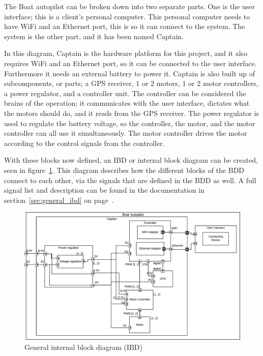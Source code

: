 The Boat autopilot can be broken down into two separate parts. One is the user interface; this is a client's personal computer. This personal computer needs to have WiFi and an Ethernet port, this is so it can connect to the system. The system is the other part, and it has been named Captain. 

In this diagram, Captain is the hardware platform for this project, and it also requires WiFi and an Ethernet port, so it can be connected to the user interface. Furthermore it needs an external battery to power it.  Captain is also built up of subcomponents, or parts; a GPS receiver, 1 or 2 motors, 1 or 2 motor controllers, a power regulator, and a controller unit. The controller can be considered the brains of the operation; it communicates with the user interface, dictates what the motors should do, and it reads from the GPS receiver. The power regulator is used to regulate the battery voltage, so the controller, the motor, and the motor controller can all use it simultaneously. The motor controller drives the motor according to the control signals from the controller. 

With these blocks now defined, an IBD or internal block diagram can be created, seen in figure~\ref{fig:generalibd}. This diagram describes how the different blocks of the BDD connect to each other, via the signals that are defined in the BDD as well. A full signal list and description can be found in the documentation in section~\ref{sec:general_ibd} on page~\pageref{sec:general_ibd}.
\begin{figure}[H]
\centering
\includegraphics[width=1\linewidth]{../Appendix/Project/Dokumentation/Images/System_architecture/General_IBD}
\caption{General internal block diagram (IBD)}
\label{fig:generalibd}
\end{figure}

